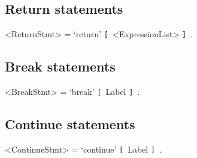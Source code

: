 \documentclass{article}
\def\lopt{\synshortsoff\texttt{[}\synshorts~}
\def\ropt{\synshortsoff\texttt{]}\synshorts~}
\begin{document}
\subsection*{Return statements}
\begin{grammar}
	<ReturnStmt> = `return' \lopt <ExpressionList> \ropt .
\end{grammar} 

\subsection*{Break statements}
\begin{grammar}
	<BreakStmt> = `break' \lopt Label \ropt .
\end{grammar}


\subsection*{Continue statements}
\begin{grammar}
	<ContinueStmt> = `continue' \lopt Label \ropt .
\end{grammar}
\end{document}
